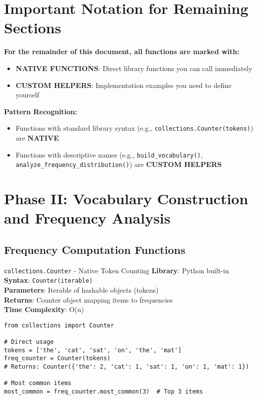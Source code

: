 \documentclass[11pt,a4paper]{article}
\begin{document}
\section{Important Notation for Remaining Sections}

\textbf{For the remainder of this document, all functions are marked with:}
\begin{itemize}
\item \textbf{\textcolor{nativecolor}{NATIVE FUNCTIONS}}: Direct library functions you can call immediately
\item \textbf{\textcolor{customcolor}{CUSTOM HELPERS}}: Implementation examples you need to define yourself
\end{itemize}

\textbf{Pattern Recognition:}
\begin{itemize}
\item Functions with standard library syntax (e.g., \texttt{collections.Counter(tokens)}) are \textbf{\textcolor{nativecolor}{NATIVE}}
\item Functions with descriptive names (e.g., \texttt{build\_vocabulary()}, \texttt{analyze\_frequency\_distribution()}) are \textbf{\textcolor{customcolor}{CUSTOM HELPERS}}
\end{itemize}

\section{Phase II: Vocabulary Construction and Frequency Analysis}

\subsection{Frequency Computation Functions}

\begin{nativebox}{\texttt{collections.Counter} - Native Token Counting}
\textbf{Library}: Python built-in \\
\textbf{Syntax}: \texttt{Counter(iterable)} \\
\textbf{Parameters}: Iterable of hashable objects (tokens) \\
\textbf{Returns}: Counter object mapping items to frequencies \\
\textbf{Time Complexity}: O(n)

\begin{lstlisting}[caption=Direct Counter usage]
from collections import Counter

# Direct usage
tokens = ['the', 'cat', 'sat', 'on', 'the', 'mat']
freq_counter = Counter(tokens)
# Returns: Counter({'the': 2, 'cat': 1, 'sat': 1, 'on': 1, 'mat': 1})

# Most common items
most_common = freq_counter.most_common(3)  # Top 3 items
\end{lstlisting}
\end{nativebox}
\end{document}
